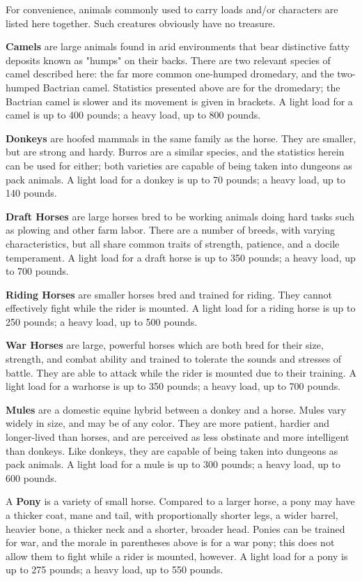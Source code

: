 \documentclass[a4paper,twoside,openany,10pt]{book}
\begin{document}
\begin{multicols}{2}
	
For convenience, animals commonly used to carry loads and/or characters are listed here together. Such creatures obviously have no treasure.

\textbf{Camels} are large animals found in arid environments that bear distinctive fatty deposits known as "humps" on their backs. There are two relevant species of camel described here: the far more common one-humped dromedary, and the two-humped Bactrian camel. Statistics presented above are for the dromedary; the Bactrian camel is slower and its movement is given in brackets. A light load for a camel is up to 400 pounds; a heavy load, up to 800 pounds.

\textbf{Donkeys} are hoofed mammals in the same family as the horse. They are smaller, but are strong and hardy. Burros are a similar species, and the statistics herein can be used for either; both varieties are capable of being taken into dungeons as pack animals. A light load for a donkey is up to 70 pounds; a heavy load, up to 140 pounds.

\textbf{Draft Horses} are large horses bred to be working animals doing hard tasks such as plowing and other farm labor. There are a number of breeds, with varying characteristics, but all share common traits of strength, patience, and a docile temperament. A light load for a draft horse is up to 350 pounds; a heavy load, up to 700 pounds.

\textbf{Riding Horses} are smaller horses bred and trained for riding. They cannot effectively fight while the rider is mounted. A light load for a riding horse is up to 250 pounds; a heavy load, up to 500 pounds.

\textbf{War Horses} are large, powerful horses which are both bred for their size, strength, and combat ability and trained to tolerate the sounds and stresses of battle. They are able to attack while the rider is mounted due to their training. A light load for a warhorse is up to 350 pounds; a heavy load, up to 700 pounds.

\textbf{Mules} are a domestic equine hybrid between a donkey and a horse. Mules vary widely in size, and may be of any color. They are more patient, hardier and longer-lived than horses, and are perceived as less obstinate and more intelligent than donkeys. Like donkeys, they are capable of being taken into dungeons as pack animals. A light load for a mule is up to 300 pounds; a heavy load, up to 600 pounds.

A \textbf{Pony} is a variety of small horse. Compared to a larger horse, a pony may have a thicker coat, mane and tail, with proportionally shorter legs, a wider barrel, heavier bone, a thicker neck and a shorter, broader head. Ponies can be trained for war, and the morale in parentheses above is for a war pony; this does not allow them to fight while a rider is mounted, however. A light load for a pony is up to 275 pounds; a heavy load, up to 550 pounds.

\end{multicols}
\end{document}
